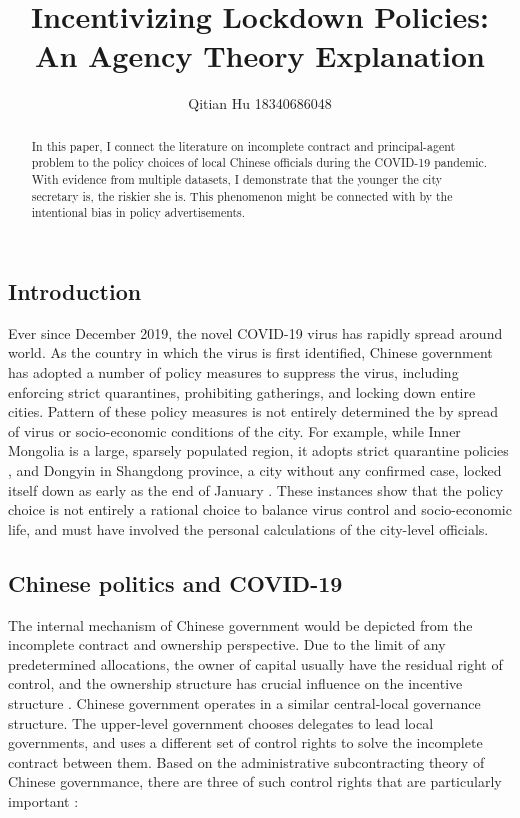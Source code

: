 \documentclass{article}
\title{Incentivizing Lockdown Policies: \\An Agency Theory Explanation}
\author{Qitian Hu 18340686048}
\begin{document}
\begin{CJK}{UTF8}{gbsn}
\maketitle %
\begin{abstract}
	In this paper, I connect the literature on incomplete contract and principal-agent problem to the policy choices of local Chinese officials during the COVID-19 pandemic. With evidence from multiple datasets, I demonstrate that the younger the city secretary is, the riskier she is. This phenomenon might be connected with by the intentional bias in policy advertisements.
\end{abstract}


\section{Introduction}
Ever since December 2019, the novel COVID-19 virus has rapidly spread around world. As the country in which the virus is first identified, Chinese government has adopted a number of policy measures to suppress the virus, including enforcing strict quarantines, prohibiting gatherings, and locking down entire cities. Pattern of these policy measures is not entirely determined the by spread of virus or socio-economic conditions of the city. For example, while Inner Mongolia is a large, sparsely populated region, it adopts strict quarantine policies \cite{inner mongolia}, and Dongyin in Shangdong province, a city without any confirmed case, locked itself down as early as the end of January \cite{yuhang}. These instances show that the policy choice is not entirely a rational choice to balance virus control and socio-economic life, and must have involved the personal calculations of the city-level officials. 


\subsection{Chinese politics and COVID-19} 

The internal mechanism of Chinese government would be depicted from the incomplete contract and ownership perspective. Due to the limit of any predetermined allocations, the owner of capital usually have the residual right of control, and the ownership structure has crucial influence on the incentive structure \cite{holmstrom and roberts 1998}. Chinese government operates in a similar central-local governance structure. The upper-level government chooses delegates to lead local governments, and uses a different set of control rights to solve the incomplete contract between them. Based on the administrative subcontracting theory of Chinese governmance, there are three of such control rights that are particularly important \cite{zxg} : 


\end{CJK}
\end{document}
